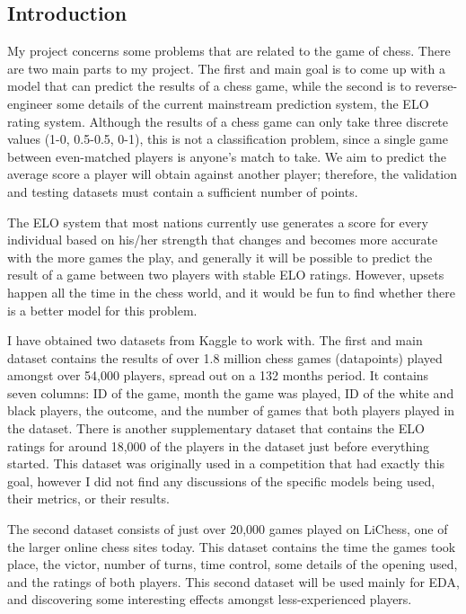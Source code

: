 \documentclass[12pt, letterpaper]{article}
\begin{document}
\begin{multicols}{2}
\raggedcolumns
\subsection*{Introduction}

My project concerns some problems that are related to the game of chess. There are two main parts to my project. The first and main goal is to come up with a model that can predict the results of a chess game, while the second is to reverse-engineer some details of the current mainstream prediction system, the ELO rating system.
Although the results of a chess game can only take three discrete values (1-0, 0.5-0.5, 0-1), this is not a classification problem, since a single game between even-matched players is anyone’s match to take. We aim to predict the average score a player will obtain against another player; therefore, the validation and testing datasets must contain a sufficient number of points.

The ELO system that most nations currently use generates a score for every individual based on his/her strength that changes and becomes more accurate with the more games the play, and generally it will be possible to predict the result of a game between two players with stable ELO ratings. However, upsets happen all the time in the chess world, and it would be fun to find whether there is a better model for this problem.

I have obtained two datasets from Kaggle to work with. The first and main dataset contains the results of over 1.8 million chess games (datapoints) played amongst over 54,000 players, spread out on a 132 months period. It contains seven columns: ID of the game, month the game was played, ID of the white and black players, the outcome, and the number of games that both players played in the dataset. There is another supplementary dataset that contains the ELO ratings for around 18,000 of the players in the dataset just before everything started. This dataset was originally used in a competition that had exactly this goal, however I did not find any discussions of the specific models being used, their metrics, or their results.

The second dataset consists of just over 20,000 games played on LiChess, one of the larger online chess sites today. This dataset contains the time the games took place, the victor, number of turns, time control, some details of the opening used, and the ratings of both players. This second dataset will be used mainly for EDA, and discovering some interesting effects amongst less-experienced players.


\end{multicols}
\end{document}
